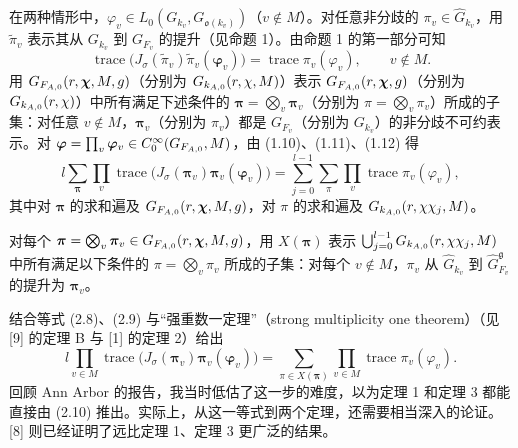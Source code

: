在两种情形中，$\varphi_v\in L_0(G_{k_v},G_{\mathfrak o(k_v)})$（$v\notin M$）。对任意非分歧的 $\pi_v\in\widehat G_{k_v}$，用 $\widetilde\pi_v$ 表示其从 $G_{k_v}$ 到 $G_{F_v}$ 的提升（见命题 1）。由命题 1 的第一部分可知
\begin{equation}
 \operatorname{trace}\bigl(J_\sigma(\widetilde\pi_v)
 \widetilde\pi_v(\boldsymbol\varphi_v)\bigr)
 =\operatorname{trace}\pi_v(\varphi_v),\qquad v\notin M.
 \tag{2.8}
\end{equation}
用 $G_{F_{A,0}}(r,\boldsymbol\chi,M,g)$（分别为 $G_{k_{A,0}}(r,\chi,M)$）表示 $G_{F_{A,0}}(r,\boldsymbol\chi,g)$（分别为 $G_{k_{A,0}}(r,\chi)$）中所有满足下述条件的 $\boldsymbol\pi=\bigotimes_v\boldsymbol\pi_v$（分别为 $\pi=\bigotimes_v\pi_v$）所成的子集：对任意 $v\notin M$，$\boldsymbol\pi_v$（分别为 $\pi_v$）都是 $G_{F_v}$（分别为 $G_{k_v}$）的非分歧不可约表示。对 $\boldsymbol\varphi=\prod_v\boldsymbol\varphi_v\in C_0^\infty(G_{F_{A,0}},M)$，由 (1.10)、(1.11)、(1.12) 得
\begin{equation}
 l\sum_{\boldsymbol\pi}\prod_v
 \operatorname{trace}\bigl(J_\sigma(\boldsymbol\pi_v)
 \boldsymbol\pi_v(\boldsymbol\varphi_v)\bigr)
 =\sum_{j=0}^{l-1}\sum_\pi\prod_v\operatorname{trace}\pi_v(\varphi_v),
 \tag{2.9}
\end{equation}
其中对 $\boldsymbol\pi$ 的求和遍及 $G_{F_{A,0}}(r,\boldsymbol\chi,M,g)$，对 $\pi$ 的求和遍及 $G_{k_{A,0}}(r,\chi\chi_j,M)$。

对每个 $\boldsymbol\pi=\bigotimes_v\boldsymbol\pi_v\in G_{F_{A,0}}(r,\boldsymbol\chi,M,g)$，用 $X(\boldsymbol\pi)$ 表示 $\bigcup_{j=0}^{l-1}G_{k_{A,0}}(r,\chi\chi_j,M)$ 中所有满足以下条件的 $\pi=\bigotimes_v\pi_v$ 所成的子集：对每个 $v\notin M$，$\pi_v$ 从 $\widehat G_{k_v}$ 到 $\widehat G_{F_v}^{\mathfrak g}$ 的提升为 $\boldsymbol\pi_v$。

结合等式 (2.8)、(2.9) 与“强重数一定理”（strong multiplicity one theorem）（见 [9] 的定理 B 与 [1] 的定理 2）给出
\begin{equation}
 l\prod_{v\in M}\operatorname{trace}\bigl(J_\sigma(\boldsymbol\pi_v)
 \boldsymbol\pi_v(\boldsymbol\varphi_v)\bigr)
 =\sum_{\pi\in X(\boldsymbol\pi)}\prod_{v\in M}
 \operatorname{trace}\pi_v(\varphi_v).
 \tag{2.10}
\end{equation}
回顾 Ann Arbor 的报告，我当时低估了这一步的难度，以为定理 1 和定理 3 都能直接由 (2.10) 推出。实际上，从这一等式到两个定理，还需要相当深入的论证。[8] 则已经证明了远比定理 1、定理 3 更广泛的结果。

